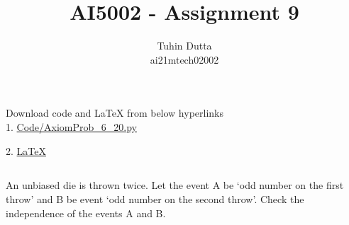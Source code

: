 \documentclass[journal,12pt,twocolumn]{IEEEtran}
\begin{document}
\providecommand{\mtx}[1]{\mathbf{#1}}
\providecommand{\fourier}{\overset{\mathcal{F}}{ \rightleftharpoons}}
\providecommand{\system}{\overset{\mathcal{H}}{ \longleftrightarrow}}
\newcommand{\solution}{\noindent \textbf{Solution: }}
\newcommand{\cosec}{\,\text{cosec}\,}
\providecommand{\dec}[2]{\ensuremath{\overset{#1}{\underset{#2}{\gtrless}}}}
\newcommand{\myvec}[1]{\ensuremath{\begin{pmatrix}#1\end{pmatrix}}}
\newcommand{\mydet}[1]{\ensuremath{\begin{vmatrix}#1\end{vmatrix}}}
\makeatletter
{}
\makeatother
\let\StandardTheFigure\thefigure
\let\vec\mathbf
\renewcommand{\thefigure}{\theproblem}
\def\putbox#1#2#3{\makebox[0in][l]{\makebox[#1][l]{}\raisebox{\baselineskip}[0in][0in]{\raisebox{#2}[0in][0in]{#3}}}}
     \def\rightbox#1{\makebox[0in][r]{#1}}
     \def\centbox#1{\makebox[0in]{#1}}
     \def\topbox#1{\raisebox{-\baselineskip}[0in][0in]{#1}}
     \def\midbox#1{\raisebox{-0.5\baselineskip}[0in][0in]{#1}}
\vspace{3cm}
\title{AI5002 - Assignment 9}
\author{Tuhin Dutta\\ ai21mtech02002}
\maketitle
\newpage
\bigskip
\renewcommand{\thefigure}{\theenumi}
\renewcommand{\thetable}{\theenumi}
\begin{mdframed}
Download code and LaTeX from below hyperlinks\\
1. \href{https://github.com/Tauhait/AI5002/blob/main/Assignment-9/Code/AxiomProb\_6\_20.py}{Code/AxiomProb\_6\_20.py}


2. \href{https://github.com/Tauhait/AI5002/tree/main/Assignment-9/LaTeX}{LaTeX}
\end{mdframed}
\subsection*{}
\begin{flushleft} An unbiased die is thrown twice. Let the event
A be `odd number on the first throw' and B
be event `odd number on the second throw'.
Check the independence of the events A and
B. \end{flushleft}
\end{document}
